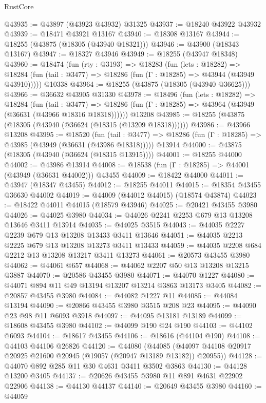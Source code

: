 \begin{lexlean}{RustCore}
\begin{coremodule}
@43935 := @43897 (@43923 @43932) @31325
@43937 := @18240 @43922 @43932
@43939 := @18471 @43921 @13167
@43940 := @18308 @13167
@43944 := @18255 (@43875 (@18305 (@43940 @18321)))
@43946 := @43900 (@18343 @13167)
@43947 := @18327 @43946
@43949 := @18255 (@43947 @18348)
@43960 := @18474
    (fun (rty : @3193) =>
    @18283
      (fun (lets : @18282) =>
      @18284 (fun (tail : @3477) => @18286 (fun (Γ : @18285) => @43944 (@43949 @43910)))))
    @10338
@43964 := @18255 (@43875 (@18305 (@43940 @36625)))
@43966 := @36632 @43905 @31330
@43978 := @18496
    (fun (lets : @18282) =>
    @18284
      (fun (tail : @3477) =>
      @18286 (fun (Γ : @18285) => @43964 (@43949 (@36631 (@43966 @18316 @18318))))))
    @13208
@43985 := @18255 (@43875 (@18305 (@43940 (@36624 (@18315 (@13209 @18318))))))
@43986 := @43966 @13208
@43995 := @18520
    (fun (tail : @3477) => @18286 (fun (Γ : @18285) => @43985 (@43949 (@36631 (@43986 @18318)))))
    @13914
@44000 := @43875 (@18305 (@43940 (@36624 (@18315 @13915))))
@44001 := @18255 @44000
@44002 := @43986 @13914
@44008 := @18538 (fun (Γ : @18285) => @44001 (@43949 (@36631 @44002))) @43455
@44009 := @18422 @44000
@44011 := @43947 (@18347 @43455)
@44012 := @18255 @44011
@44015 := @18354 @43455 @36630 @44002
@44019 := @44009 (@44012 @44015) (@18574 @43874)
@44023 := @18422 @44011 @44015 (@18579 @43946)
@44025 := @20421 @43455 @3980
@44026 := @44025 @3980
@44034 := @44026 @2241 @2253 @679 @13 @13208 @13646 @3411 @13914
@44035 := @44025 @3515
@44043 := @44035 @2227 @2239 @679 @13 @13208 @13433 @3411 @13646
@44051 := @44035 @2213 @2225 @679 @13 @13208 @13273 @3411 @13433
@44059 := @44035 @2208 @684 @2212 @13 @13208 @13217 @3411 @13273
@44061 := @20573 @43455 @3980
@44062 := @44061 @657
@44068 := @44062 @2207 @50 @13 @13208 @13215 @3887
@44070 := @20586 @43455 @3980
@44071 := @44070 @1227
@44080 := @44071 @894 @11 @49 @13194 @13207 @13214 @3863 @13173 @3405
@44082 := @20857 @43455 @3980
@44084 := @44082 @1227 @11
@44085 := @44084 @13194
@44090 := @20866 @43455 @3980 @3515 @208 @23
@44095 := @44090 @23 @98 @11 @6093 @3918
@44097 := @44095 @13181 @13189
@44099 := @18608 @43455 @3980
@44102 := @44099 @190 @24 @190
@44103 := @44102 @6093
@44104 := @18617 @43455
@44106 := @18616 (@44104 @190)
@44108 := @44103 @44106 @26826
@44120 := @44080
    (@44085 (@44097 @44108 @20917 @20925 @21600 @20945 (@19057 (@20947 @13189 @13182)) @20955))
@44128 := @44070 @892 @285 @11 @30 @4631 @3411 @3502 @3863
@44130 := @44128 @13200 @3405
@44137 := @20626 @43455 @3980 @11 @891 @4631 @22902 @22906
@44138 := @44130 @44137
@44140 := @20649 @43455 @3980
@44160 := @44059

\end{coremodule}
\end{lexlean}
